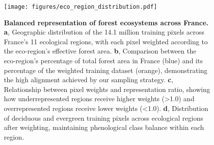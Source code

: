 \begin{figure}[t]
    \centering
    \texttt{[image: figures/eco\_region\_distribution.pdf]}
    \caption{\textbf{Balanced representation of forest ecosystems across France.} 
    \textbf{a}, Geographic distribution of the 14.1 million training pixels across France's 11 ecological regions, with each pixel weighted according to the eco-region's effective forest area. 
    \textbf{b}, Comparison between the eco-region's percentage of total forest area in France (blue) and its percentage of the weighted training dataset (orange), demonstrating the high alignment achieved by our sampling strategy. 
    \textbf{c}, Relationship between pixel weights and representation ratio, showing how underrepresented regions receive higher weights (>1.0) and overrepresented regions receive lower weights (<1.0). 
    \textbf{d}, Distribution of deciduous and evergreen training pixels across ecological regions after weighting, maintaining phenological class balance within each region.}
    \label{fig:eco_region_distribution}
\end{figure} 